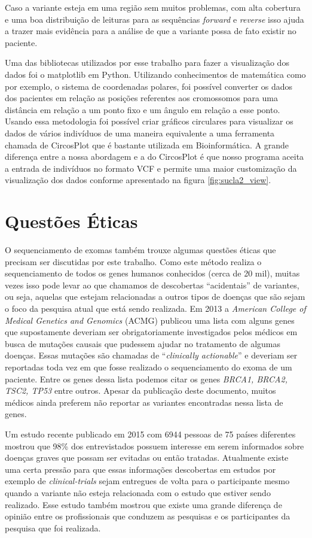Caso a variante esteja em uma região sem muitos problemas, com alta cobertura e uma boa distribuição de leituras para as sequências \textit{forward} e \textit{reverse} isso ajuda a trazer mais evidência para a análise de que a variante possa de fato existir no paciente.

Uma das bibliotecas utilizados por esse trabalho para fazer a visualização dos dados foi o matplotlib em Python. Utilizando conhecimentos de matemática como por exemplo, o sistema de coordenadas polares, foi possível converter os dados dos pacientes em relação as posições referentes aos cromossomos para uma distância em relação a um ponto fixo e um ângulo em relação a esse ponto. Usando essa metodologia foi possível criar gráficos circulares para visualizar os dados de vários indivíduos de uma maneira equivalente a uma ferramenta chamada de CircosPlot que é bastante utilizada em Bioinformática. A grande diferença entre a nossa abordagem e a do CircosPlot é que nosso programa aceita a entrada de indivíduos no formato VCF e permite uma maior customização da visualização dos dados conforme apresentado na figura \ref{fig:sucla2_view}.

\section{Questões Éticas}

O sequenciamento de exomas também trouxe algumas questões éticas que precisam ser discutidas por este trabalho. Como este método realiza o sequenciamento de todos os genes humanos conhecidos (cerca de 20 mil), muitas vezes isso pode levar ao que chamamos de descobertas ``acidentais'' de variantes, ou seja, aquelas que estejam relacionadas a outros tipos de doenças que são sejam o foco da pesquisa atual que está sendo realizada. Em 2013 a \textit{American College of Medical Genetics and Genomics} (ACMG) \cite{Green2013} publicou uma lista com alguns genes que supostamente deveriam ser obrigatoriamente investigados pelos médicos em busca de mutações causais que pudessem ajudar no tratamento de algumas doenças. Essas mutações são chamadas de ``\textit{clinically actionable}'' e deveriam ser reportadas toda vez em que fosse realizado o sequenciamento do exoma de um paciente. Entre os genes dessa lista podemos citar os genes \textit{BRCA1, BRCA2, TSC2, TP53} entre outros. Apesar da publicação deste documento, muitos médicos ainda preferem não reportar as variantes encontradas nessa lista de genes.

Um estudo recente publicado em 2015 \cite{Middleton2015} com 6944 pessoas de 75 países diferentes mostrou que 98\% dos entrevistados possuem interesse em serem informados sobre doenças graves que possam ser evitadas ou então tratadas. Atualmente existe uma certa pressão para que essas informações descobertas em estudos por exemplo de \textit{clinical-trials} sejam entregues de volta para o participante mesmo quando a variante não esteja relacionada com o estudo que estiver sendo realizado. Esse estudo também mostrou que existe uma grande diferença de opinião entre os profissionais que conduzem as pesquisas e os participantes da pesquisa que foi realizada.

